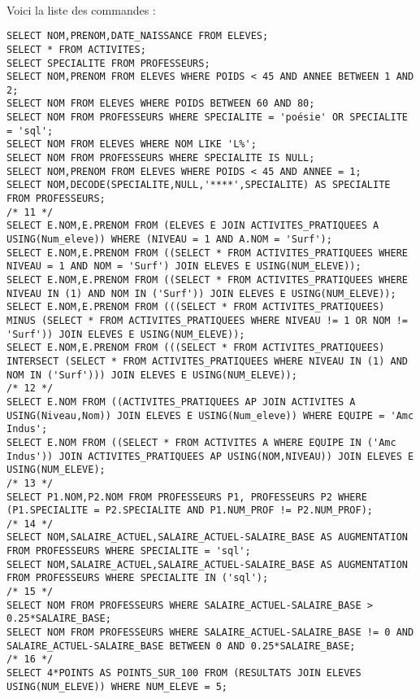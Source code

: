 \documentclass{report}
\begin{document}
\paragraph{}Voici la liste des commandes :

\begin{lstlisting}
SELECT NOM,PRENOM,DATE_NAISSANCE FROM ELEVES;
SELECT * FROM ACTIVITES;
SELECT SPECIALITE FROM PROFESSEURS;
SELECT NOM,PRENOM FROM ELEVES WHERE POIDS < 45 AND ANNEE BETWEEN 1 AND 2;
SELECT NOM FROM ELEVES WHERE POIDS BETWEEN 60 AND 80;
SELECT NOM FROM PROFESSEURS WHERE SPECIALITE = 'poésie' OR SPECIALITE = 'sql';
SELECT NOM FROM ELEVES WHERE NOM LIKE 'L%';
SELECT NOM FROM PROFESSEURS WHERE SPECIALITE IS NULL;
SELECT NOM,PRENOM FROM ELEVES WHERE POIDS < 45 AND ANNEE = 1;
SELECT NOM,DECODE(SPECIALITE,NULL,'****',SPECIALITE) AS SPECIALITE FROM PROFESSEURS;
/* 11 */
SELECT E.NOM,E.PRENOM FROM (ELEVES E JOIN ACTIVITES_PRATIQUEES A USING(Num_eleve)) WHERE (NIVEAU = 1 AND A.NOM = 'Surf');
SELECT E.NOM,E.PRENOM FROM ((SELECT * FROM ACTIVITES_PRATIQUEES WHERE NIVEAU = 1 AND NOM = 'Surf') JOIN ELEVES E USING(NUM_ELEVE));
SELECT E.NOM,E.PRENOM FROM ((SELECT * FROM ACTIVITES_PRATIQUEES WHERE NIVEAU IN (1) AND NOM IN ('Surf')) JOIN ELEVES E USING(NUM_ELEVE));
SELECT E.NOM,E.PRENOM FROM (((SELECT * FROM ACTIVITES_PRATIQUEES) MINUS (SELECT * FROM ACTIVITES_PRATIQUEES WHERE NIVEAU != 1 OR NOM != 'Surf')) JOIN ELEVES E USING(NUM_ELEVE));
SELECT E.NOM,E.PRENOM FROM (((SELECT * FROM ACTIVITES_PRATIQUEES) INTERSECT (SELECT * FROM ACTIVITES_PRATIQUEES WHERE NIVEAU IN (1) AND NOM IN ('Surf'))) JOIN ELEVES E USING(NUM_ELEVE));
/* 12 */
SELECT E.NOM FROM ((ACTIVITES_PRATIQUEES AP JOIN ACTIVITES A USING(Niveau,Nom)) JOIN ELEVES E USING(Num_eleve)) WHERE EQUIPE = 'Amc Indus';
SELECT E.NOM FROM ((SELECT * FROM ACTIVITES A WHERE EQUIPE IN ('Amc Indus')) JOIN ACTIVITES_PRATIQUEES AP USING(NOM,NIVEAU)) JOIN ELEVES E USING(NUM_ELEVE);
/* 13 */
SELECT P1.NOM,P2.NOM FROM PROFESSEURS P1, PROFESSEURS P2 WHERE (P1.SPECIALITE = P2.SPECIALITE AND P1.NUM_PROF != P2.NUM_PROF);
/* 14 */
SELECT NOM,SALAIRE_ACTUEL,SALAIRE_ACTUEL-SALAIRE_BASE AS AUGMENTATION FROM PROFESSEURS WHERE SPECIALITE = 'sql';
SELECT NOM,SALAIRE_ACTUEL,SALAIRE_ACTUEL-SALAIRE_BASE AS AUGMENTATION FROM PROFESSEURS WHERE SPECIALITE IN ('sql');
/* 15 */
SELECT NOM FROM PROFESSEURS WHERE SALAIRE_ACTUEL-SALAIRE_BASE > 0.25*SALAIRE_BASE;
SELECT NOM FROM PROFESSEURS WHERE SALAIRE_ACTUEL-SALAIRE_BASE != 0 AND SALAIRE_ACTUEL-SALAIRE_BASE BETWEEN 0 AND 0.25*SALAIRE_BASE;
/* 16 */
SELECT 4*POINTS AS POINTS_SUR_100 FROM (RESULTATS JOIN ELEVES USING(NUM_ELEVE)) WHERE NUM_ELEVE = 5;

\end{lstlisting}
\end{document}
